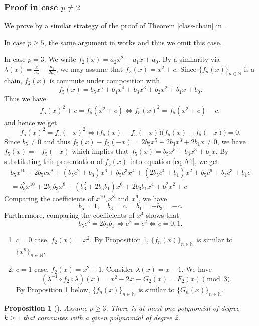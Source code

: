 \documentclass[a4paper, 11pt]{amsart}
\numberwithin{equation}{section}
\newtheorem{prop}[thm]{Proposition}
\theoremstyle{definition}
\newcommand{\N}{\mathbb{N}}
\begin{document}
\subsubsection{Proof in case $p\neq 2$}
We prove by a similar strategy of the proof of Theorem \ref{class-chain} in \cite{W}.

In case $p\geq 5$, the same argument in \cite[\S4]{W} works and thus we omit this case.

In case $p=3$.
We write $f_2(x)=a_2x^2+a_1x+a_0$.
By a similarity via $\lambda(x)=\frac{x}{a_2}-\frac{a_1}{2a_2}$, we may assume that $f_2(x)=x^2+c$.
Since $\{f_n(x)\}_{n\in \N}$ is a chain, $f_2(x)$ is commute under composition with
\[
f_5(x)=b_5x^5+b_4x^4+b_3x^3+b_2x^2+b_1x+b_0.
\]
Thus we have
\begin{align}\label{eq-A1}
f_5(x)^2+c=f_5(x^2+c)\iff f_5(x)^2=f_5(x^2+c)-c,
\end{align}
and hence we get 
\[
f_5(x)^2=f_5(-x)^2\iff \bigl(f_5(x)-f_5(-x)\bigr)\bigl(f_5(x)+f_5(-x)\bigr)=0.
\]
Since $b_5\neq 0$ and thus $f_5(x)-f_5(-x)=2b_5x^5+2b_3x^3+2b_1x\neq 0$, we have $f_5(x)=-f_5(-x)$ which implies that $f_5(x)=b_5x^5+b_3x^3+b_1x$.
By substituting this presentation of $f_5(x)$ into equation \eqref{eq-A1}, we get
\begin{align*}
b_5x^{10}+2b_5cx^8+(b_5c^2+b_3)x^6+b_5c^3x^4+(2b_5c^4+b_1)x^2+b_5c^6+b_3c^3+b_1c\\
=b_5^2x^{10}+2b_5b_3x^8+(b_3^2+2b_5b_1)x^6+2b_3b_1x^4+b_1^2x^2+c
\end{align*}
Comparing the coefficients of $x^{10}, x^8$ and $x^6$, we have
\[
b_5=1, \quad b_3=c, \quad b_1=-b_3=-c.
\]
Furthermore, comparing the coefficients of $x^4$ shows that 
\[
b_5c^3=2b_3b_1\iff c^3=c^2\iff c=0, 1.
\]
\begin{enumerate}
\item
$c=0$ case.
$f_2(x)=x^2$.
By Proposition \ref{prop-A}, $\{f_n(x)\}_{n\in \N}$ is similar to $\{x^n\}_{n\in \N}$.
\item
$c=1$ case.
$f_2(x)=x^2+1.$
Consider $\lambda(x)=x-1$.
We have
\[
(\lambda^{-1}\circ f_2\circ \lambda)(x)=x^2-2x\equiv G_2(x)= F_2(x)\pmod 3.
\]
By Proposition \ref{prop-A} below, $\{f_n(x)\}_{n\in \N}$ is similar to $\{G_n(x)\}_{n\in \N}$.
\end{enumerate}

\begin{prop}[]\label{prop-A}
Assume $p\geq 3$.
There is at most one polynomial of degree $k\geq 1$ that commutes with a given polynomial of degree 2.
\end{prop}
\end{document}
